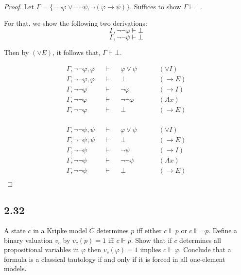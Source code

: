 \documentclass[12pt]{article}
\begin{document}
\begin{proof}
Let $\Gamma = \{\neg \neg \varphi \vee \neg \neg \psi, \neg(\varphi \rightarrow \psi)\}$. Suffices to show $\Gamma \vdash \bot$.

For that, we show the following two derivations:
$$\Gamma, \neg \neg \varphi \vdash \bot$$
$$\Gamma, \neg \neg \psi \vdash \bot$$

Then by $(\vee E)$, it follows that, $\Gamma \vdash \bot$.

\begin{align*}
    \Gamma, \neg \neg \varphi, \varphi &&\vdash&& \varphi \vee \psi &&&& (\vee I) \\
    \Gamma, \neg \neg \varphi, \varphi &&\vdash&& \bot &&&& (\rightarrow E) \\
    \Gamma, \neg \neg \varphi &&\vdash&& \neg \varphi &&&& (\rightarrow I) \\
    \Gamma, \neg \neg \varphi &&\vdash&& \neg \neg \varphi &&&& (Ax) \\
    \Gamma, \neg \neg \varphi &&\vdash&& \bot &&&& (\rightarrow E) \\
\end{align*}

\begin{align*}
    \Gamma, \neg \neg \psi, \psi &&\vdash&& \varphi \vee \psi &&&& (\vee I) \\
    \Gamma, \neg \neg \psi, \psi &&\vdash&& \bot &&&& (\rightarrow E) \\
    \Gamma, \neg \neg \psi &&\vdash&& \neg \psi &&&& (\rightarrow I) \\
    \Gamma, \neg \neg \psi &&\vdash&& \neg \neg \psi &&&& (Ax) \\
    \Gamma, \neg \neg \psi &&\vdash&& \bot &&&& (\rightarrow E) \\
\end{align*}

\end{proof}


\subsection*{2.32}
A state $c$ in a Kripke model $C$ determines $p$ iff either $c \Vdash p$ or $c \Vdash \neg p$. Define a binary valuation $v_c$ by $v_c(p) = 1$ iff $c \Vdash p$. Show that if $c$ determines all propositional variables in $\varphi$ then $v_c(\varphi) = 1$ implies $c \Vdash \varphi$. Conclude that a formula is a classical tautology if and only if it is forced in all one-element models. \\
\end{document}
